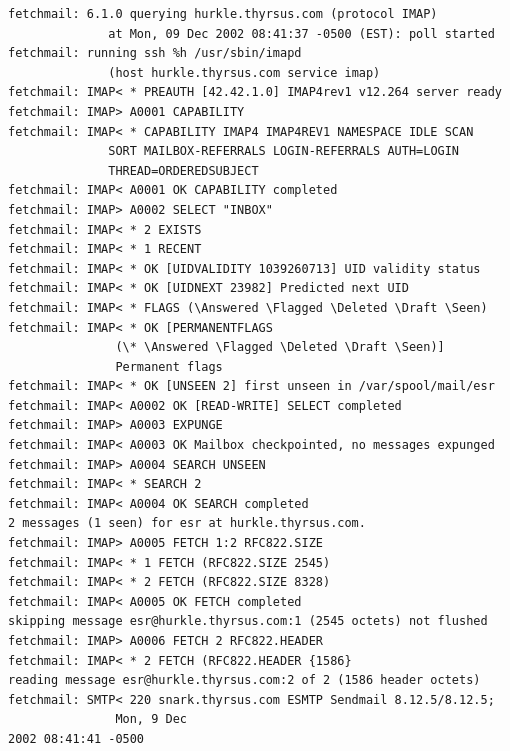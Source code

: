 \documentclass[12pt,oneside]{book}
\begin{document}
\begin{Verbatim}[label=例6.1  fetchmail的-v记录实例]
fetchmail: 6.1.0 querying hurkle.thyrsus.com (protocol IMAP) 
              at Mon, 09 Dec 2002 08:41:37 -0500 (EST): poll started
fetchmail: running ssh %h /usr/sbin/imapd 
              (host hurkle.thyrsus.com service imap)
fetchmail: IMAP< * PREAUTH [42.42.1.0] IMAP4rev1 v12.264 server ready
fetchmail: IMAP> A0001 CAPABILITY
fetchmail: IMAP< * CAPABILITY IMAP4 IMAP4REV1 NAMESPACE IDLE SCAN 
              SORT MAILBOX-REFERRALS LOGIN-REFERRALS AUTH=LOGIN 
              THREAD=ORDEREDSUBJECT
fetchmail: IMAP< A0001 OK CAPABILITY completed
fetchmail: IMAP> A0002 SELECT "INBOX"
fetchmail: IMAP< * 2 EXISTS
fetchmail: IMAP< * 1 RECENT
fetchmail: IMAP< * OK [UIDVALIDITY 1039260713] UID validity status
fetchmail: IMAP< * OK [UIDNEXT 23982] Predicted next UID
fetchmail: IMAP< * FLAGS (\Answered \Flagged \Deleted \Draft \Seen)
fetchmail: IMAP< * OK [PERMANENTFLAGS 
               (\* \Answered \Flagged \Deleted \Draft \Seen)] 
               Permanent flags
fetchmail: IMAP< * OK [UNSEEN 2] first unseen in /var/spool/mail/esr
fetchmail: IMAP< A0002 OK [READ-WRITE] SELECT completed
fetchmail: IMAP> A0003 EXPUNGE
fetchmail: IMAP< A0003 OK Mailbox checkpointed, no messages expunged
fetchmail: IMAP> A0004 SEARCH UNSEEN
fetchmail: IMAP< * SEARCH 2
fetchmail: IMAP< A0004 OK SEARCH completed
2 messages (1 seen) for esr at hurkle.thyrsus.com.
fetchmail: IMAP> A0005 FETCH 1:2 RFC822.SIZE
fetchmail: IMAP< * 1 FETCH (RFC822.SIZE 2545)
fetchmail: IMAP< * 2 FETCH (RFC822.SIZE 8328)
fetchmail: IMAP< A0005 OK FETCH completed
skipping message esr@hurkle.thyrsus.com:1 (2545 octets) not flushed
fetchmail: IMAP> A0006 FETCH 2 RFC822.HEADER
fetchmail: IMAP< * 2 FETCH (RFC822.HEADER {1586}
reading message esr@hurkle.thyrsus.com:2 of 2 (1586 header octets)
fetchmail: SMTP< 220 snark.thyrsus.com ESMTP Sendmail 8.12.5/8.12.5; 
               Mon, 9 Dec
2002 08:41:41 -0500


\end{Verbatim}
\end{document}
